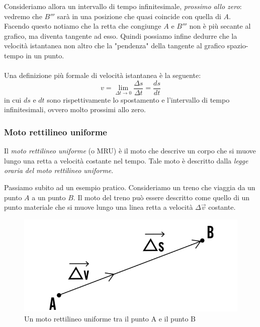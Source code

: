 \documentclass[11pt]{article}
\begin{document}
Consideriamo allora un intervallo di tempo infinitesimale, \textit{prossimo allo zero}: vedremo che $B'''$ sarà in una posizione che quasi coincide con quella di $A$. Facendo questo notiamo che la retta che congiunge $A$ e $B'''$ non è più secante al grafico, ma diventa tangente ad esso. Quindi possiamo infine dedurre che la velocità istantanea non altro che la "pendenza" della tangente al grafico spazio-tempo in un punto.
\\ \\ 
Una definizione più formale di velocità istantanea è la seguente:
\begin{equation}
v = \lim_{\Delta t \to 0} \dfrac{\Delta s}{\Delta t} = \dfrac{ds}{dt}
\end{equation}
in cui $ds$ e $dt$ sono rispettivamente lo spostamento e l'intervallo di tempo infinitesimali, ovvero molto prossimi allo zero.

\subsubsection{Moto rettilineo uniforme}
Il\textit{ moto rettilineo uniforme} (o MRU) è il moto che descrive un corpo che si muove lungo una retta a velocità costante nel tempo. Tale moto è descritto dalla \textit{legge oraria del moto rettilineo uniforme}.

Passiamo subito ad un esempio pratico. Consideriamo un treno che viaggia da un punto $A$ a un punto $B$. Il moto del treno può essere descritto come quello di un punto materiale che si muove lungo una linea retta a velocità $\Delta \overrightarrow{v}$ costante.

\begin{figure}[H]
\label{motoRettilineoUniformeA-B}

\includegraphics[scale=0.7]{moto_ret_unif.png}
\caption{Un moto rettilineo uniforme tra il punto A e il punto B}
\centering
\end{figure}
\end{document}
